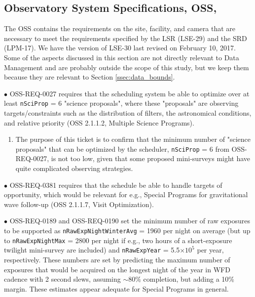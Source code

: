 \documentclass[DM,lsstdraft,toc]{lsstdoc}
\begin{document}
\subsection{Observatory System Specifications, OSS, }\label{ssec:docrev_oss}

The OSS contains the requirements on the site, facility, and camera that are necessary to meet the requirements specified by the LSR (LSE-29) and the SRD (LPM-17). We have the version of LSE-30 last revised on February 10, 2017. Some of the aspects discussed in this section are not directly relevant to Data Management and are probably outside the scope of this study, but we keep them because they are relevant to Section \ref{ssec:data_bounds}.

$\bullet$ OSS-REQ-0027 requires that the scheduling system be able to optimize over at least \texttt{nSciProp} = 6 "science proposals", where these "proposals" are observing targets/constraints such as the distribution of filters, the astronomical conditions, and relative priority (OSS 2.1.1.2, Multiple Science Programs).
\begin{enumerate}[resume,topsep=-10pt,after=\vspace{10pt},label= \textbf{Action \Roman*}] \item \label{OSS-1} The purpose of this ticket is to confirm that the minimum number of "science proposals" that can be optimized by the scheduler, \texttt{nSciProp} = 6 from OSS-REQ-0027, is not too low, given that some proposed mini-surveys might have quite complicated observing strategies. \end{enumerate} %

$\bullet$ OSS-REQ-0381 requires that the schedule be able to handle targets of opportunity, which would be relevant for e.g., Special Programs for gravitational wave follow-up (OSS 2.1.1.7, Visit Optimization).

$\bullet$ OSS-REQ-0189 and OSS-REQ-0190 set the minimum number of raw exposures to be supported as \texttt{nRawExpNightWinterAvg} = 1960 per night on average (but up to \texttt{nRawExpNightMax} = 2800 per night if e.g., two hours of a short-exposure twilight mini-survey are included) and \texttt{nRawExpYear} = 5.5$\times10^5$ per year, respectively. These numbers are set by predicting the maximum number of exposures that would be acquired on the longest night of the year in WFD cadence with 2 second slews, assuming $\sim80\%$ completion, but adding a 10\% margin. These estimates appear adequate for Special Programs in general.
\end{document}
